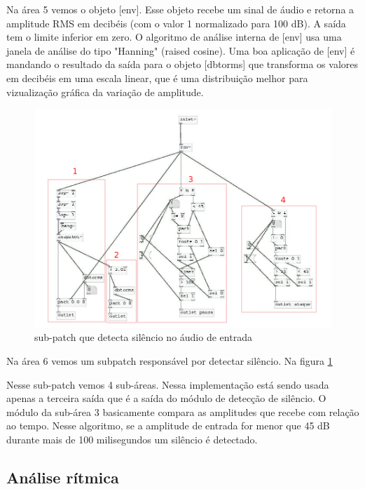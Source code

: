 \documentclass[draft]{ppgmus}
\begin{document}
Na área 5 vemos o objeto [env\texttildelow]. Esse objeto recebe um sinal de áudio
e retorna a amplitude RMS em decibéis (com o valor 1 normalizado para 100 dB).
A saída tem o limite inferior em zero. O algoritmo de análise interna de [env\texttildelow]
usa uma janela de análise do tipo "Hanning" (raised cosine). Uma boa aplicação de 
[env\texttildelow] é mandando o resultado da saída para o objeto [dbtorms] que transforma
os valores em decibéis em uma escala linear, que é uma distribuição melhor para vizualização
gráfica da variação de amplitude.






\begin{figure}
\includegraphics[scale=.5]{sinc-audioanalise-detecta}
\caption{sub-patch que detecta silêncio no áudio de entrada}
\label{[sinc-audioanalise-detecta]}
\end{figure}




Na área 6 vemos um subpatch responsável por detectar
silêncio. Na figura \ref{[sinc-audioanalise-detecta]}


Nesse sub-patch vemos 4 sub-áreas. Nessa implementação
está sendo usada apenas a terceira saída que é a saída do
módulo de detecção de silêncio. O módulo da sub-área 3
basicamente compara as amplitudes que recebe com relação ao tempo.
Nesse algoritmo, se a amplitude de entrada for menor que 45 dB durante
mais de 100 milisegundos um silêncio é detectado.



\subsection{Análise rítmica}
\end{document}
